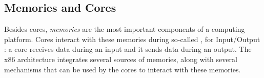 %

\subsection{Memories and Cores \IOs}
\label{subsec:usecase:mem}
%
Besides cores, \emph{memories} are the most important components of a computing
platform.
%
Cores interact with these memories during so-called \IOs, for Input/Output : a
core receives data during an input and it sends data during an output.
%
The x86 architecture integrates several sources of memories, along with several
mechanisms that can be used by the cores to interact with these memories.


